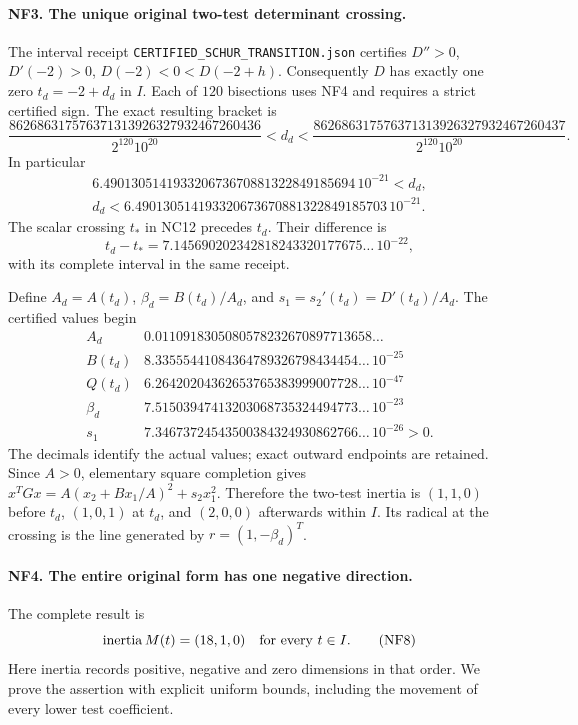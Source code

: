 \documentclass[11pt,a4paper]{article}
\theoremstyle{definition}\newtheorem{definition}[theorem]{Definition}
\begin{document}
\paragraph{NF3. The unique original two-test determinant crossing.}
The interval receipt \texttt{CERTIFIED\_SCHUR\_TRANSITION.json}
certifies $D''>0$, $D'(-2)>0$, $D(-2)<0<D(-2+h)$.
Consequently $D$ has exactly one zero $t_d=-2+d_d$ in $I$.
Each of $120$ bisections uses NF4 and requires a strict certified
sign. The exact resulting bracket is
\[
 \frac{862686317576371313926327932467260436}{2^{120}10^{20}}
 <d_d<
 \frac{862686317576371313926327932467260437}{2^{120}10^{20}}.
 \tag{NF5}
\]
In particular
\[
\begin{split}
6.490130514193320673670881322849185694\,10^{-21}<d_d,\\
d_d<6.490130514193320673670881322849185703\,10^{-21}.
\end{split}\tag{NF6}
\]
The scalar crossing $t_*$ in NC12 precedes $t_d$. Their difference is
\[
t_d-t_*=7.145690202342818243320177675\ldots\,10^{-22},
\]
with its complete interval in the same receipt.

Define $A_d=A(t_d)$, $\beta_d=B(t_d)/A_d$, and
$s_1=s_2'(t_d)=D'(t_d)/A_d$. The certified values begin
\[
\begin{array}{c|l}
A_d&0.0110918305080578232670897713658\ldots\\
B(t_d)&8.33555441084364789326798434454\ldots\,10^{-25}\\
Q(t_d)&6.26420204362653765383999007728\ldots\,10^{-47}\\
\beta_d&7.51503947413203068735324494773\ldots\,10^{-23}\\
s_1&7.34673724543500384324930862766\ldots\,10^{-26}>0.
\end{array}\tag{NF7}
\]
The decimals identify the actual values; exact outward endpoints
are retained. Since $A>0$, elementary square completion gives
$x^TGx=A(x_2+Bx_1/A)^2+s_2x_1^2$. Therefore the two-test
inertia is $(1,1,0)$ before $t_d$, $(1,0,1)$ at $t_d$, and
$(2,0,0)$ afterwards within $I$. Its radical at the crossing is
the line generated by $r=(1,-\beta_d)^T$.

\paragraph{NF4. The entire original form has one negative direction.}
The complete result is
\[
 \operatorname{inertia}M(t)=(18,1,0)\quad\hbox{for every }t\in I.
 \tag{NF8}
\]
Here inertia records positive, negative and zero dimensions in
that order. We prove the assertion with explicit uniform bounds,
including the movement of every lower test coefficient.
\end{document}
